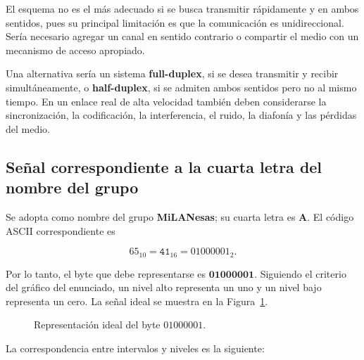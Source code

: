 ﻿\documentclass[12pt,a4paper]{article}
\begin{document}
El esquema no es el más adecuado si se busca transmitir rápidamente y en ambos
sentidos, pues su principal limitación es que la comunicación es unidireccional.
Sería necesario agregar un canal en sentido contrario o compartir el medio con
un mecanismo de acceso apropiado.

Una alternativa sería un sistema \textbf{full-duplex}, si se desea transmitir y
recibir simultáneamente, o \textbf{half-duplex}, si se admiten ambos sentidos
pero no al mismo tiempo. En un enlace real de alta velocidad también deben
considerarse la sincronización, la codificación, la interferencia, el ruido, la
diafonía y las pérdidas del medio.

\subsection{Señal correspondiente a la cuarta letra del nombre del grupo}

Se adopta como nombre del grupo \textbf{MiLANesas}; su cuarta letra es
\textbf{A}. El código ASCII correspondiente es

\[
65_{10}=\mathtt{41}_{16}=01000001_2.
\]

Por lo tanto, el byte que debe representarse es $\mathbf{01000001}$. Siguiendo
el criterio del gráfico del enunciado, un nivel alto representa un uno y un
nivel bajo representa un cero. La señal ideal se muestra en la
Figura~\ref{fig:uart}.

\begin{figure}[H]
\centering
{}
\caption{Representación ideal del byte $01000001$.}
\label{fig:uart}
\end{figure}

La correspondencia entre intervalos y niveles es la siguiente:
\end{document}

